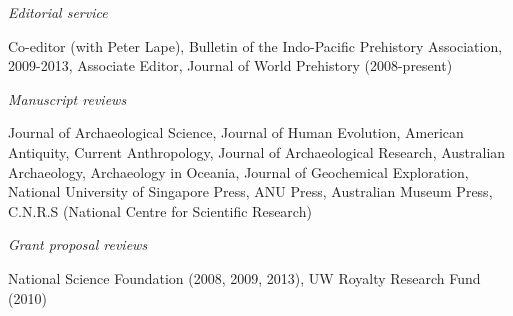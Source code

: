 

\medskip

\noindent\emph{Editorial service\vspace{0.01in}}

\ind Co-editor (with Peter Lape), Bulletin of the Indo-Pacific Prehistory Association, 2009-2013, Associate Editor, Journal of World Prehistory (2008-present)

 \vspace{0.05in}

\noindent\emph{Manuscript reviews\vspace{0.01in}}

\noindent Journal of Archaeological Science, Journal of Human Evolution, American Antiquity, Current Anthropology, Journal of Archaeological Research, Australian Archaeology, Archaeology in Oceania, Journal of Geochemical Exploration, National University of Singapore Press, ANU Press, Australian Museum Press, C.N.R.S (National Centre for Scientific Research)

 \vspace{0.05in}

\noindent\emph{Grant proposal reviews\vspace{0.01in}}

\noindent National Science Foundation (2008, 2009, 2013), UW Royalty Research Fund (2010)
